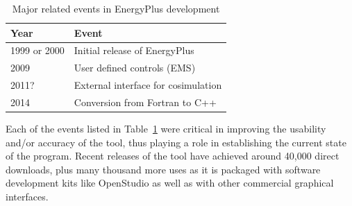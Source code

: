 \documentclass[5p]{elsarticle}
\begin{document}
\begin{table}
\begin{center}
\caption{Major related events in EnergyPlus development}
\begin{tabular}{@{}ll@{}}
\toprule
Year         & Event                               \\ 
\midrule
1999 or 2000 & Initial release of EnergyPlus       \\
2009         & User defined controls (EMS)         \\
2011?        & External interface for cosimulation \\
2014         & Conversion from Fortran to C++      \\ 
\bottomrule
\end{tabular}
\label{table:background:events}
\end{center}
\end{table}

Each of the events listed in Table~\ref{table:background:events} were critical in improving the usability and/or accuracy of the tool, thus playing a role in establishing the current state of the program.  Recent releases of the tool have achieved around 40,000 direct downloads, plus many thousand more uses as it is packaged with software development kits like OpenStudio as well as with other commercial graphical interfaces. 
\end{document}
